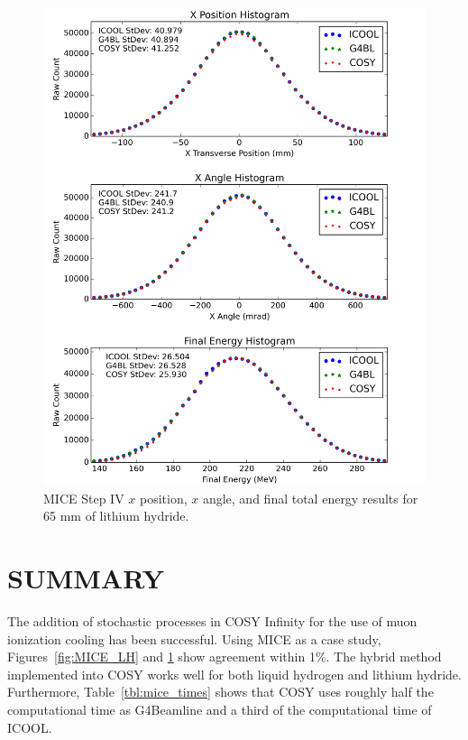 \documentclass{jacow}
\begin{document}
\begin{figure}[htb]
  \centering
    \includegraphics[width=\columnwidth]{Figures/MICE_LiH} 
  \caption{MICE Step IV $x$ position, $x$ angle, and final total energy results for 65 mm of lithium hydride.}
  \label{fig:MICE_LiH}
\end{figure}


\section{SUMMARY}
The addition of stochastic processes in COSY Infinity for the use of muon ionization cooling has been successful. %
Using MICE as a case study, Figures~\ref{fig:MICE_LH} and \ref{fig:MICE_LiH} show agreement within 1\%. The hybrid method implemented into COSY works well for both liquid hydrogen and lithium hydride. Furthermore, Table~\ref{tbl:mice_times} shows that COSY uses roughly half the computational time as G4Beamline and a third of the computational time of ICOOL.
\end{document}
